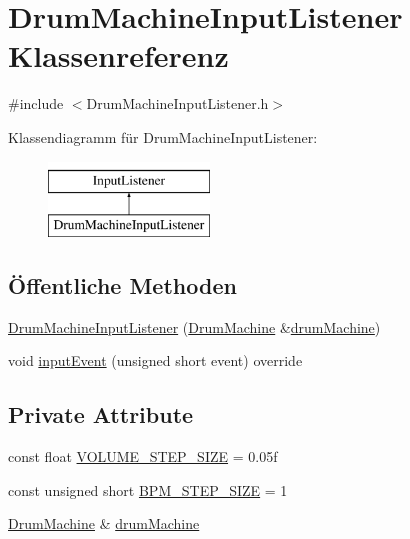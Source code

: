 \hypertarget{class_drum_machine_input_listener}{}\section{Drum\+Machine\+Input\+Listener Klassenreferenz}
\label{class_drum_machine_input_listener}


{\ttfamily \#include $<$Drum\+Machine\+Input\+Listener.\+h$>$}

Klassendiagramm für Drum\+Machine\+Input\+Listener\+:\begin{figure}[H]
\begin{center}
\leavevmode
\includegraphics[height=2.000000cm]{class_drum_machine_input_listener}
\end{center}
\end{figure}
\subsection*{Öffentliche Methoden}
\begin{DoxyCompactItemize}
\item 
\hyperlink{class_drum_machine_input_listener_a7552c36ebae9e6ae49f8929ae9853354}{Drum\+Machine\+Input\+Listener} (\hyperlink{class_drum_machine}{Drum\+Machine} \&\hyperlink{class_drum_machine_input_listener_ae3f80aad0a5c4b2e4ad2712423102feb}{drum\+Machine})
\item 
void \hyperlink{class_drum_machine_input_listener_a44a620b09b35885a26befe84fa6e1ab0}{input\+Event} (unsigned short event) override
\end{DoxyCompactItemize}
\subsection*{Private Attribute}
\begin{DoxyCompactItemize}
\item 
const float \hyperlink{class_drum_machine_input_listener_a983e85ff0ebfbb3de0a917134488570c}{V\+O\+L\+U\+M\+E\+\_\+\+S\+T\+E\+P\+\_\+\+S\+I\+ZE} = 0.\+05f
\item 
const unsigned short \hyperlink{class_drum_machine_input_listener_ad4f83d21be6ff1ba703a27d8c9a04c9a}{B\+P\+M\+\_\+\+S\+T\+E\+P\+\_\+\+S\+I\+ZE} = 1
\item 
\hyperlink{class_drum_machine}{Drum\+Machine} \& \hyperlink{class_drum_machine_input_listener_ae3f80aad0a5c4b2e4ad2712423102feb}{drum\+Machine}
\end{DoxyCompactItemize}


